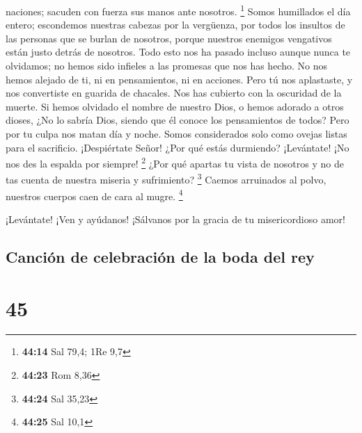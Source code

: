 naciones; sacuden con fuerza sus manos ante nosotros. \footnote{\textbf{44:14}
  Sal 79,4; 1Re 9,7}  Somos humillados el día entero;
escondemos nuestras cabezas por la vergüenza,  por todos
los insultos de las personas que se burlan de nosotros, porque nuestros
enemigos vengativos están justo detrás de nosotros.  Todo
esto nos ha pasado incluso aunque nunca te olvidamos; no hemos sido
infieles a las promesas que nos has hecho.  No nos hemos
alejado de ti, ni en pensamientos, ni en acciones.  Pero tú
nos aplastaste, y nos convertiste en guarida de chacales. Nos has
cubierto con la oscuridad de la muerte.  Si hemos olvidado
el nombre de nuestro Dios, o hemos adorado a otros dioses, 
¿No lo sabría Dios, siendo que él conoce los pensamientos de todos?
 Pero por tu culpa nos matan día y noche. Somos
considerados solo como ovejas listas para el sacrificio. 
¡Despiértate Señor! ¿Por qué estás durmiendo? ¡Levántate! ¡No nos des la
espalda por siempre! \footnote{\textbf{44:23} Rom 8,36} 
¿Por qué apartas tu vista de nosotros y no de tas cuenta de nuestra
miseria y sufrimiento? \footnote{\textbf{44:24} Sal 35,23} 
Caemos arruinados al polvo, nuestros cuerpos caen de cara al mugre.
\footnote{\textbf{44:25} Sal 10,1}

 ¡Levántate! ¡Ven y ayúdanos! ¡Sálvanos por la gracia de tu
misericordioso amor!

\hypertarget{canciuxf3n-de-celebraciuxf3n-de-la-boda-del-rey}{%
\subsection{Canción de celebración de la boda del
rey}\label{canciuxf3n-de-celebraciuxf3n-de-la-boda-del-rey}}

\hypertarget{section-44}{%
\section{45}\label{section-44}}

